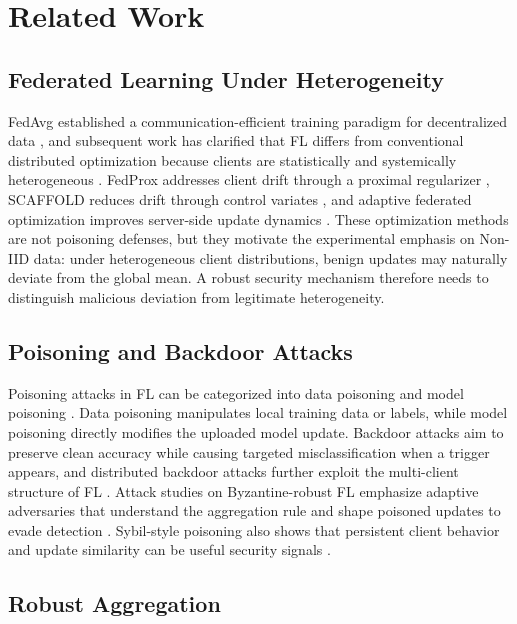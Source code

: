 \documentclass[preprint,authoryear,12pt]{elsarticle}
\begin{document}
\section{Related Work}

\subsection{Federated Learning Under Heterogeneity}

FedAvg established a communication-efficient training paradigm for decentralized data \citep{mcmahan2017fedavg}, and subsequent work has clarified that FL differs from conventional distributed optimization because clients are statistically and systemically heterogeneous \citep{kairouz2021advances}. FedProx addresses client drift through a proximal regularizer \citep{li2020fedprox}, SCAFFOLD reduces drift through control variates \citep{karimireddy2020scaffold}, and adaptive federated optimization improves server-side update dynamics \citep{reddi2021fedopt}. These optimization methods are not poisoning defenses, but they motivate the experimental emphasis on Non-IID data: under heterogeneous client distributions, benign updates may naturally deviate from the global mean. A robust security mechanism therefore needs to distinguish malicious deviation from legitimate heterogeneity.

\subsection{Poisoning and Backdoor Attacks}

Poisoning attacks in FL can be categorized into data poisoning and model poisoning \citep{nist2024aml,mothukuri2021survey}. Data poisoning manipulates local training data or labels, while model poisoning directly modifies the uploaded model update. Backdoor attacks aim to preserve clean accuracy while causing targeted misclassification when a trigger appears, and distributed backdoor attacks further exploit the multi-client structure of FL \citep{bagdasaryan2020backdoor,xie2020dba,nguyen2022flame}. Attack studies on Byzantine-robust FL emphasize adaptive adversaries that understand the aggregation rule and shape poisoned updates to evade detection \citep{fang2020local,baruch2019little,wang2025adaaggrl}. Sybil-style poisoning also shows that persistent client behavior and update similarity can be useful security signals \citep{fung2020foolsgold}.

\subsection{Robust Aggregation}
\end{document}
